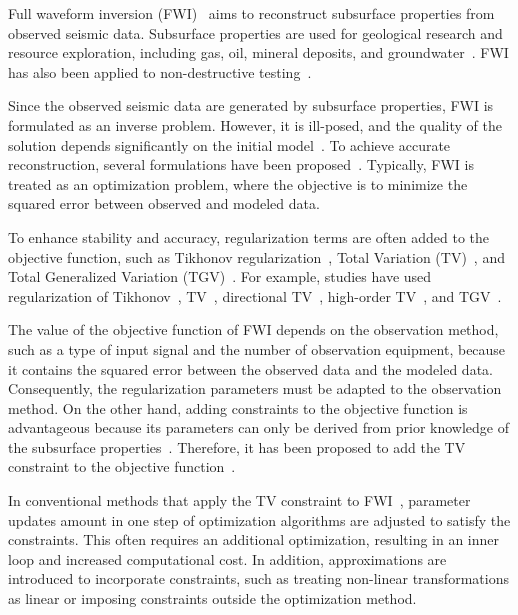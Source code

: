 Full waveform inversion (FWI)~\cite{FWI0,FWI1} aims to reconstruct subsurface properties from observed seismic data.
Subsurface properties are used for geological research and resource exploration, including gas, oil, mineral deposits, and groundwater~\cite{FWI1,FWIApplicationGroundwater0,FWIApplicationGroundwater1}.
FWI has also been applied to non-destructive testing~\cite{FWIApplicationNonDestructiveTesting0,FWIApplicationNonDestructiveTesting1}.

Since the observed seismic data are generated by subsurface properties, FWI is formulated as an inverse problem.
However, it is ill-posed, and the quality of the solution depends significantly on the initial model~\cite{FWI1}.
To achieve accurate reconstruction, several formulations have been proposed~\cite{FWI0,CustomFWI0,CustomFWI1,CustomFWI2,CustomFWI3,CustomFWI4,CustomFWI5}.
Typically, FWI is treated as an optimization problem, where the objective is to minimize the squared error between observed and modeled data.

To enhance stability and accuracy, regularization terms are often added to the objective function, such as Tikhonov regularization~\cite{tikhonov}, Total Variation (TV)~\cite{TV}, and Total Generalized Variation (TGV)~\cite{TGV}.
For example, studies have used regularization of Tikhonov~\cite{FWI-with-tikhonov-regularization}, TV~\cite{FWI-with-TV-regularization}, directional TV~\cite{FWI-with-directional-TV-regularization}, high-order TV~\cite{FWI-with-high-order-TV-regularization}, and TGV~\cite{FWI-with-TGV-regularization}.

The value of the objective function of FWI depends on the observation method, such as a type of input signal and the number of observation equipment, because it contains the squared error between the observed data and the modeled data.
Consequently, the regularization parameters must be adapted to the observation method.
On the other hand, adding constraints to the objective function is advantageous because its parameters can only be derived from prior knowledge of the subsurface properties~\cite{constraints-vs-penalties-in-FWI}.
Therefore, it has been proposed to add the TV constraint to the objective function~\cite{FWI-with-TV-constraint,FWI-with-TV-constraint2,FWI-with-TV-constraint3}.

In conventional methods that apply the TV constraint to FWI~\cite{FWI-with-TV-constraint,FWI-with-TV-constraint2}, parameter updates amount in one step of optimization algorithms are adjusted to satisfy the constraints.
This often requires an additional optimization, resulting in an inner loop and increased computational cost.
In addition, approximations are introduced to incorporate constraints, such as treating non-linear transformations as linear or imposing constraints outside the optimization method.

